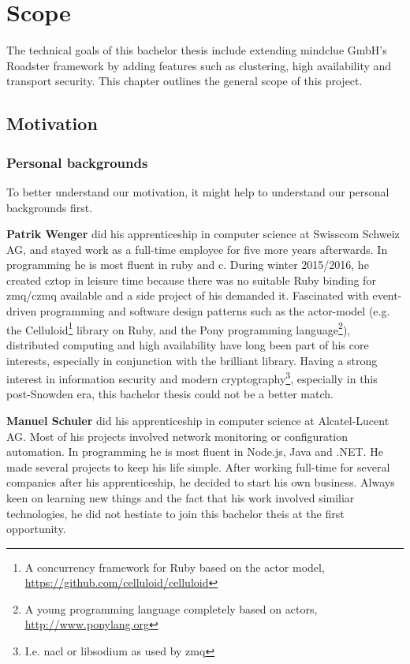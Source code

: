 \chapter{Scope}
The technical goals of this bachelor thesis include extending mindclue GmbH's
Roadster framework by adding features such as clustering, high availability and
transport security. This chapter outlines the general scope of this project.

\section{Motivation}
\subsection{Personal backgrounds}
To better understand our motivation, it might help to understand our personal
backgrounds first.

\textbf{Patrik Wenger} did his apprenticeship in computer science at Swisscom
Schweiz AG, and stayed work as a full-time employee for five more years
afterwards. In programming he is most fluent in \gls{ruby} and \gls{c}. During
winter 2015/2016, he created \gls{cztop} in leisure time because
there was no suitable Ruby binding for \gls{zmq}/\gls{czmq} available and a side
project of his demanded it. Fascinated with event-driven programming and
software design patterns such as the \gls{actor-model} (e.g. the
Celluloid\footnote{A concurrency framework for Ruby based on the actor model,
\url{https://github.com/celluloid/celluloid}} library on Ruby,
and the Pony programming language\footnote{A young programming language completely based on actors,
\url{http://www.ponylang.org}}), distributed computing and high availability
have long been part of his core interests, especially in conjunction with the
brilliant \zmq library. Having a strong interest in information security and modern
cryptography\footnote{I.e. \gls{nacl} or \gls{libsodium} as used by
\gls{zmq}}, especially in this post-Snowden era, this bachelor thesis could not
be a better match.

\textbf{Manuel Schuler} did his apprenticeship in computer science at
Alcatel-Lucent AG.  Most of his projects involved network monitoring or
configuration automation. In programming he is most fluent in Node.js, Java and .NET. He
made several projects to keep his life simple. After working full-time for
several companies after his apprenticeship, he decided to start his own
business.  Always keen on learning new things and the fact that his work
involved similiar technologies, he did not hestiate to join this bachelor theis
at the first opportunity.

